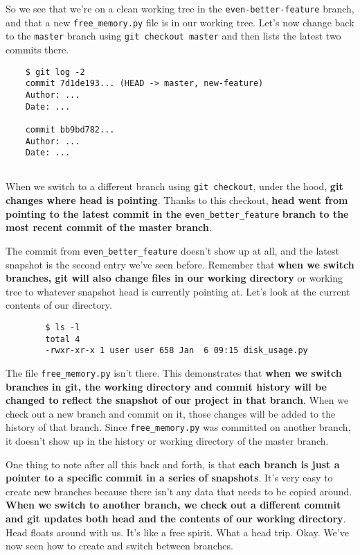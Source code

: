 	So we see that we're on a clean working tree in the \verb|even-better-feature| branch, and that a new \verb|free_memory.py| file is in our working tree. 
	Let's now change back to the \texttt{master} branch using \texttt{git checkout master} and then lists the latest two commits there. 
	
\begin{verbatim}
	$ git log -2
	commit 7d1de193... (HEAD -> master, new-feature)
	Author: ...
	Date: ...
	
	commit bb9bd782... 
	Author: ...
	Date: ...
		
\end{verbatim}	
	
	When we switch to a different branch using \texttt{git checkout}, under the hood, \textbf{git changes where head is pointing}. Thanks to this checkout,\textbf{ head went from pointing to the latest commit in the} \verb|even_better_feature| \textbf{branch to the most recent commit of the master branch}. 
	
	The commit from \verb|even_better_feature| doesn't show up at all, and the latest snapshot is the second entry we've seen before. Remember that\textbf{ when we switch branches, git will also change files in our working directory} or working tree to whatever snapshot head is currently pointing at. Let's look at the current contents of our directory.
	
	\begin{verbatim}
		$ ls -l
		total 4
		-rwxr-xr-x 1 user user 658 Jan  6 09:15 disk_usage.py		
	\end{verbatim}
	
	The file \verb|free_memory.py| isn't there. This demonstrates that\textbf{ when we switch branches in git, the working directory and commit history will be changed to reflect the snapshot of our project in that branch}. When we check out a new branch and commit on it, those changes will be added to the history of that branch. Since \verb|free_memory.py| was committed on another branch, it doesn't show up in the history or working directory of the master branch. 
	
	One thing to note after all this back and forth, is that \textbf{each branch is just a pointer to a specific commit in a series of snapshots}. It's very easy to create new branches because there isn't any data that needs to be copied around.\textbf{ When we switch to another branch, we check out a different commit and git updates both head and the contents of our working directory}. Head floats around with us. It's like a free spirit. What a head trip. Okay. We've now seen how to create and switch between branches. 
	
